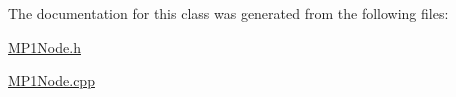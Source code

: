 \-The documentation for this class was generated from the following files\-:\begin{DoxyCompactItemize}
\item 
\hyperlink{_m_p1_node_8h}{\-M\-P1\-Node.\-h}\item 
\hyperlink{_m_p1_node_8cpp}{\-M\-P1\-Node.\-cpp}\end{DoxyCompactItemize}
